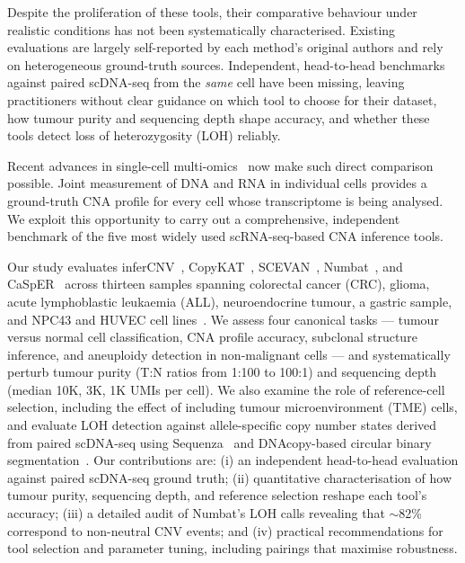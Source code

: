 Despite the proliferation of these tools, their comparative behaviour under realistic conditions has not been systematically characterised. Existing evaluations are largely self-reported by each method's original authors and rely on heterogeneous ground-truth sources. Independent, head-to-head benchmarks against paired scDNA-seq from the \emph{same} cell have been missing, leaving practitioners without clear guidance on which tool to choose for their dataset, how tumour purity and sequencing depth shape accuracy, and whether these tools detect loss of heterozygosity (LOH) reliably.

Recent advances in single-cell multi-omics~\cite{macaulay2015gtseq,zachariadis2020dntrseq,zhou2020singlecell} now make such direct comparison possible. Joint measurement of DNA and RNA in individual cells provides a ground-truth CNA profile for every cell whose transcriptome is being analysed. We exploit this opportunity to carry out a comprehensive, independent benchmark of the five most widely used scRNA-seq-based CNA inference tools.

Our study evaluates inferCNV~\cite{tickle2019infercnv}, CopyKAT~\cite{gao2021copykat}, SCEVAN~\cite{defalco2023scevan}, Numbat~\cite{gao2023numbat}, and CaSpER~\cite{serin2020casper} across thirteen samples spanning colorectal cancer (CRC), glioma, acute lymphoblastic leukaemia (ALL), neuroendocrine tumour, a gastric sample, and NPC43 and HUVEC cell lines~\cite{zhou2020singlecell,zachariadis2020dntrseq}. We assess four canonical tasks --- tumour versus normal cell classification, CNA profile accuracy, subclonal structure inference, and aneuploidy detection in non-malignant cells --- and systematically perturb tumour purity (T:N ratios from 1:100 to 100:1) and sequencing depth (median 10K, 3K, 1K UMIs per cell). We also examine the role of reference-cell selection, including the effect of including tumour microenvironment (TME) cells, and evaluate LOH detection against allele-specific copy number states derived from paired scDNA-seq using Sequenza~\cite{favero2015sequenza} and DNAcopy-based circular binary segmentation~\cite{olshen2004dnacopy,willenbrock2005comparison}. Our contributions are: (i) an independent head-to-head evaluation against paired scDNA-seq ground truth; (ii) quantitative characterisation of how tumour purity, sequencing depth, and reference selection reshape each tool's accuracy; (iii) a detailed audit of Numbat's LOH calls revealing that $\sim$82\% correspond to non-neutral CNV events; and (iv) practical recommendations for tool selection and parameter tuning, including pairings that maximise robustness.
